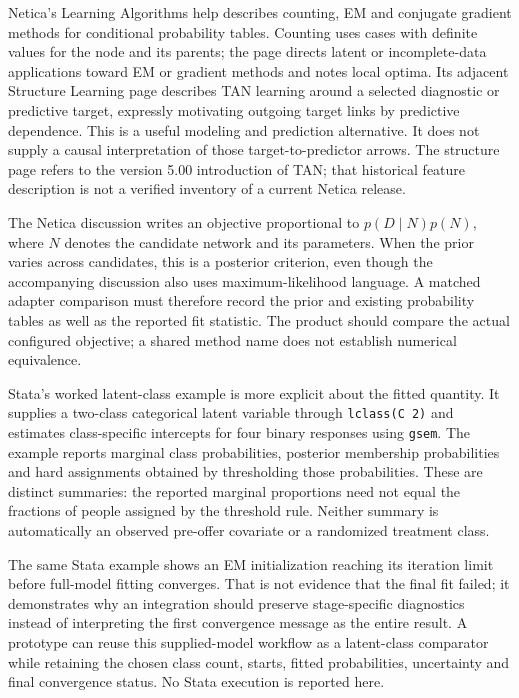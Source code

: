 Netica's Learning Algorithms help describes counting, EM and conjugate
gradient methods for conditional probability tables. Counting uses cases
with definite values for the node and its parents; the page directs
latent or incomplete-data applications toward EM or gradient methods and
notes local optima. Its adjacent Structure Learning page describes TAN
learning around a selected diagnostic or predictive target, expressly
motivating outgoing target links by predictive dependence. This is a
useful modeling and prediction alternative. It does not supply a causal
interpretation of those target-to-predictor arrows. The structure page
refers to the version 5.00 introduction of TAN; that historical feature
description is not a verified inventory of a current Netica release.
\citep{exec13_latent_netica_algorithms,exec13_latent_netica_structure}

The Netica discussion writes an objective proportional to
\(p(D\mid N)p(N)\), where \(N\) denotes the candidate network and its
parameters. When the prior varies across candidates, this is a posterior
criterion, even though the accompanying discussion also uses
maximum-likelihood language. A matched adapter comparison must therefore
record the prior and existing probability tables as well as the reported
fit statistic. The product should compare the actual configured
objective; a shared method name does not establish numerical
equivalence. \citep{exec13_latent_netica_algorithms}

Stata's worked latent-class example is more explicit about the fitted
quantity. It supplies a two-class categorical latent variable through
\texttt{lclass(C 2)} and estimates class-specific intercepts for four
binary responses using \texttt{gsem}. The example reports marginal class
probabilities, posterior membership probabilities and hard assignments
obtained by thresholding those probabilities. These are distinct
summaries: the reported marginal proportions need not equal the
fractions of people assigned by the threshold rule. Neither summary is
automatically an observed pre-offer covariate or a randomized treatment
class. \citep[pp.2--6]{exec13_latent_stata_lca}

The same Stata example shows an EM initialization reaching its iteration
limit before full-model fitting converges. That is not evidence that the
final fit failed; it demonstrates why an integration should preserve
stage-specific diagnostics instead of interpreting the first convergence
message as the entire result. A prototype can reuse this supplied-model
workflow as a latent-class comparator while retaining the chosen class
count, starts, fitted probabilities, uncertainty and final convergence
status. No Stata execution is reported here.
\citep[pp.3--5]{exec13_latent_stata_lca}

